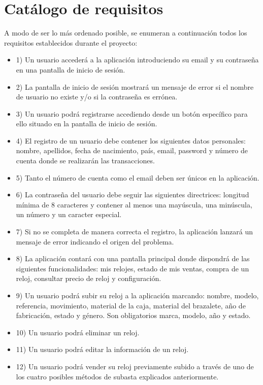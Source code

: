 \section{Catálogo de requisitos}

	A modo de ser lo más ordenado posible, se enumeran a continuación todos los requisitos establecidos durante el proyecto:
	
\begin{itemize}
	\item 1) Un usuario accederá a la aplicación introduciendo su email y su contraseña en una pantalla de inicio de sesión.
	\item 2) La pantalla de inicio de sesión mostrará un mensaje de error si el nombre de usuario no existe y/o si la contraseña es errónea.
	\item 3) Un usuario podrá registrarse accediendo desde un botón específico para ello situado en la pantalla de inicio de sesión.	
	\item 4) El registro de un usuario debe contener los siguientes datos personales: nombre, apellidos, fecha de nacimiento, país, email, password y número de cuenta donde se realizarán las transacciones.
	\item 5) Tanto el número de cuenta como el email deben ser únicos en la aplicación.
	\item 6) La contraseña del usuario debe seguir las siguientes directrices: longitud mínima de 8 caracteres y contener al menos una mayúscula, una minúscula, un número y un caracter especial.
	\item 7) Si no se completa de manera correcta el registro, la aplicación lanzará un mensaje de error indicando el origen del problema.
	\item 8) La aplicación contará con una pantalla principal donde dispondrá de las siguientes funcionalidades: mis relojes, estado de mis ventas, compra de un reloj, consultar precio de reloj y configuración.
	\item 9) Un usuario podrá subir su reloj a la aplicación marcando: nombre, modelo, referencia, movimiento, material de la caja, material del brazalete, año de fabricación, estado y género. Son obligatorios marca, modelo, año y estado.
	\item 10) Un usuario podrá eliminar un reloj.
	\item 11) Un usuario podrá editar la información de un reloj.
	\item 12) Un usuario podrá vender su reloj previamente subido a través de uno de los cuatro posibles métodos de subasta explicados anteriormente.

\end{itemize}
